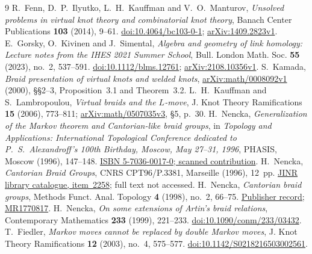 \documentclass[11pt]{article}
\begin{document}
\begingroup
\small
\begin{thebibliography}{9}
 R.~Fenn, D.~P.~Ilyutko, L.~H.~Kauffman and V.~O.~Manturov,
\emph{Unsolved problems in virtual knot theory and combinatorial knot theory},
Banach Center Publications \textbf{103} (2014), 9--61.
\href{https://doi.org/10.4064/bc103-0-1}{doi:10.4064/bc103-0-1};
\href{https://arxiv.org/abs/1409.2823v1}{arXiv:1409.2823v1}.
 E.~Gorsky, O.~Kivinen and J.~Simental,
\emph{Algebra and geometry of link homology: Lecture notes from the IHES 2021 Summer School},
Bull. London Math. Soc. \textbf{55} (2023), no.~2, 537--591.
\href{https://doi.org/10.1112/blms.12761}{doi:10.1112/blms.12761};
\href{https://arxiv.org/abs/2108.10356v1}{arXiv:2108.10356v1}.
 S.~Kamada,
\emph{Braid presentation of virtual knots and welded knots},
\href{https://arxiv.org/abs/math/0008092v1}{arXiv:math/0008092v1} (2000),
\S\S2--3, Proposition~3.1 and Theorem~3.2.
 L.~H.~Kauffman and S.~Lambropoulou,
\emph{Virtual braids and the $L$-move},
J. Knot Theory Ramifications \textbf{15} (2006), 773--811;
\href{https://arxiv.org/abs/math/0507035v3}{arXiv:math/0507035v3}, \S5, p.~30.
 H.~Nencka,
\emph{Generalization of the Markov theorem and Cantorian-like braid groups},
in \emph{Topology and Applications: International Topological Conference
dedicated to P.~S.~Alexandroff's 100th Birthday, Moscow, May 27--31, 1996},
PHASIS, Moscow (1996), 147--148.
\href{https://ru.djvu.online/file/OzKCMNnU4ojPn}{ISBN 5-7036-0017-0; scanned contribution}.
 H.~Nencka, \emph{Cantorian Braid Groups},
CNRS CPT96/P.3381, Marseille (1996), 12~pp.
\href{https://ntb.jinr.ru/arch99/pw32.html}{JINR library catalogue, item~2258};
full text not accessed.
 H.~Nencka, \emph{Cantorian braid groups},
Methods Funct. Anal. Topology \textbf{4} (1998), no.~2, 66--75.
\href{https://mfat.imath.kiev.ua/article/?id=71}{Publisher record; MR1770817}.
 H.~Nencka, \emph{On some extensions of Artin's braid relations},
Contemporary Mathematics \textbf{233} (1999), 221--233.
\href{https://doi.org/10.1090/conm/233/03432}{doi:10.1090/conm/233/03432}.
 T.~Fiedler,
\emph{Markov moves cannot be replaced by double Markov moves},
J. Knot Theory Ramifications \textbf{12} (2003), no.~4, 575--577.
\href{https://doi.org/10.1142/S0218216503002561}{doi:10.1142/S0218216503002561}.
\end{thebibliography}
\endgroup
\end{document}
